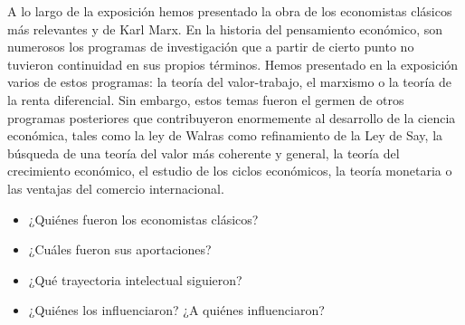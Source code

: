 \documentclass{nuevotema}
\begin{document}
A lo largo de la exposición hemos presentado la obra de los economistas clásicos más relevantes y de Karl Marx. En la historia del pensamiento económico, son numerosos los programas de investigación que a partir de cierto punto no tuvieron continuidad en sus propios términos. Hemos presentado en la exposición varios de estos programas: la teoría del valor-trabajo, el marxismo o la teoría de la renta diferencial. Sin embargo, estos temas fueron el germen de otros programas posteriores que contribuyeron enormemente al desarrollo de la ciencia económica, tales como la ley de Walras como refinamiento de la Ley de Say, la búsqueda de una teoría del valor más coherente y general, la teoría del crecimiento económico, el estudio de los ciclos económicos, la teoría monetaria o las ventajas del comercio internacional. 

\begin{itemize}
	\item ¿Quiénes fueron los economistas clásicos?
	\item ¿Cuáles fueron sus aportaciones?
	\item ¿Qué trayectoria intelectual siguieron?
	\item ¿Quiénes los influenciaron? ¿A quiénes influenciaron?
\end{itemize}

\esquemacorto
\end{document}
